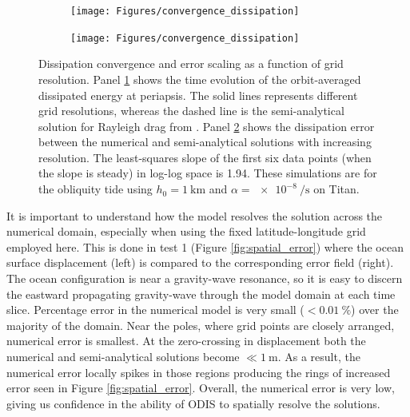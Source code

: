 \begin{figure}[!t]
    \centering
    \begin{subfigure}[t]{\linewidth} %
        \texttt{[image: Figures/convergence\_dissipation]}
        \label{fig:conv_a}
    \end{subfigure}
    \begin{subfigure}[t]{0\linewidth} %
         \texttt{[image: Figures/convergence\_dissipation]}
         \label{fig:conv_b}   
    \end{subfigure}
    \vspace{-0.5cm}
\caption{Dissipation convergence and error scaling as a function of grid resolution. Panel \ref{fig:conv_a} shows the time evolution of the orbit-averaged dissipated energy at periapsis. The solid lines represents different grid resolutions, whereas the dashed line is the semi-analytical solution for Rayleigh drag from \citet{matsuyama2014tidal}. Panel \ref{fig:conv_b} shows the dissipation error between the numerical and semi-analytical solutions with increasing resolution. The least-squares slope of the first six data points (when the slope is steady) in log-log space is \num{1.94}. These simulations are for the obliquity tide using $h_0 = \SI{1}{\kilo\metre}$ and $\alpha = \SI{e-8}{\per\second}$ on Titan. \label{fig:conv}}
\end{figure}

It is important to understand how the model resolves the solution across the numerical domain, especially when using the fixed latitude-longitude grid employed here. This is done in test 1 (Figure \ref{fig:spatial_error}) where the ocean surface displacement (left) is compared to the corresponding error field (right). The ocean configuration is near a gravity-wave resonance, so it is easy to discern the eastward propagating gravity-wave through the model domain at each time slice. Percentage error in the numerical model is very small ($< \SI{0.01}{\percent}$) over the majority of the domain. Near the poles, where grid points are closely arranged, numerical error is smallest. At the zero-crossing in displacement both the numerical and semi-analytical solutions become $\ll \SI{1}{\metre}$. As a result, the numerical error locally spikes in those regions producing the rings of increased error seen in Figure \ref{fig:spatial_error}. Overall, the numerical error is very low, giving us confidence in the ability of ODIS to spatially resolve the solutions.

